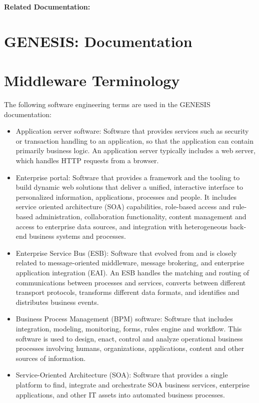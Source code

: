 \documentclass[12pt]{article}
\begin{document}
{\bf Related Documentation:}

\section*{GENESIS: Documentation}

\section{Middleware Terminology}

The following software engineering terms are used in the GENESIS
documentation:

\begin{itemize}
\item Application server software: Software that provides services
  such as security or transaction handling to an application, so that
  the application can contain primarily business logic. An application
  server typically includes a web server, which handles HTTP requests
  from a browser.

\item Enterprise portal: Software that provides a framework and the
  tooling to build dynamic web solutions that deliver a unified,
  interactive interface to personalized information, applications,
  processes and people. It includes service oriented architecture
  (SOA) capabilities, role-based access and rule-based administration,
  collaboration functionality, content management and access to
  enterprise data sources, and integration with heterogeneous back-end
  business systems and processes.

\item Enterprise Service Bus (ESB): Software that evolved from and is
  closely related to message-oriented middleware, message brokering,
  and enterprise application integration (EAI). An ESB handles the
  matching and routing of communications between processes and
  services, converts between different transport protocols, transforms
  different data formats, and identifies and distributes business
  events.

\item Business Process Management (BPM) software: Software that
  includes integration, modeling, monitoring, forms, rules engine and
  workflow. This software is used to design, enact, control and
  analyze operational business processes involving humans,
  organizations, applications, content and other sources of
  information.

\item Service-Oriented Architecture (SOA): Software that provides a
  single platform to find, integrate and orchestrate SOA business
  services, enterprise applications, and other IT assets into
  automated business processes.
\end{itemize}
\end{document}
